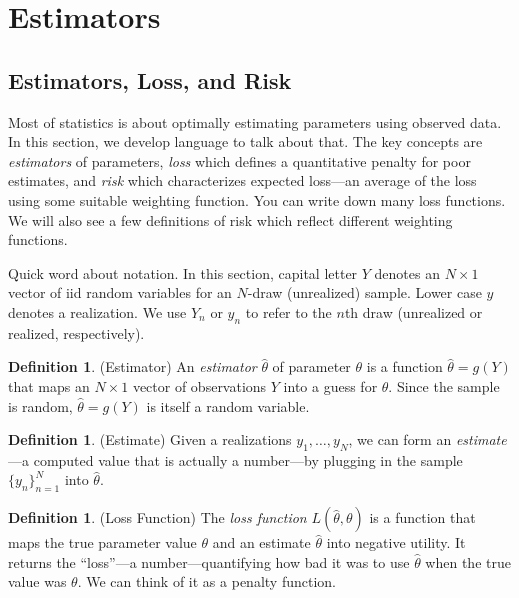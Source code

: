 \documentclass[12pt]{article}
\theoremstyle{plain}
\theoremstyle{definition}
\newtheorem{defn}[thm]{Definition}
\theoremstyle{remark}
\begin{document}
\section{Estimators}

\subsection{Estimators, Loss, and Risk}

Most of statistics is about optimally estimating parameters using
observed data. In this section, we develop language to talk about that.
The key concepts are \emph{estimators} of parameters, \emph{loss} which
defines a quantitative penalty for poor estimates, and \emph{risk} which
characterizes expected loss---an average of the loss using some suitable
weighting function. You can write down many loss functions. We will also
see a few definitions of risk which reflect different weighting
functions.

Quick word about notation. In this section, capital letter $Y$ denotes
an $N\times 1$ vector of iid random variables for an $N$-draw
(unrealized) sample. Lower case $y$ denotes a realization. We use $Y_n$
or $y_n$ to refer to the $n$th draw (unrealized or realized,
respectively).


\begin{defn}(Estimator)
An \emph{estimator} $\hat{\theta}$ of parameter $\theta$ is a function
$\hat{\theta} = g(Y)$ that maps an $N\times 1$ vector of
observations $Y$ into a guess for $\theta$.  Since the sample is
random, $\hat{\theta}=g(Y)$ is itself a random variable.
\end{defn}

\begin{defn}(Estimate)
Given a realizations $y_1,\ldots,y_N$, we can form an
\emph{estimate}---a computed value that is actually a number---by
plugging in the sample $\{y_n\}^N_{n=1}$ into $\hat{\theta}$.
\end{defn}

\begin{defn}(Loss Function)
The \emph{loss function} $L(\hat{\theta},\theta)$ is a function that
maps the true parameter value $\theta$ and an estimate $\hat{\theta}$
into negative utility. It returns the ``loss''---a number---quantifying
how bad it was to use $\hat{\theta}$ when the true value was $\theta$.
We can think of it as a penalty function.
\end{defn}
\end{document}
